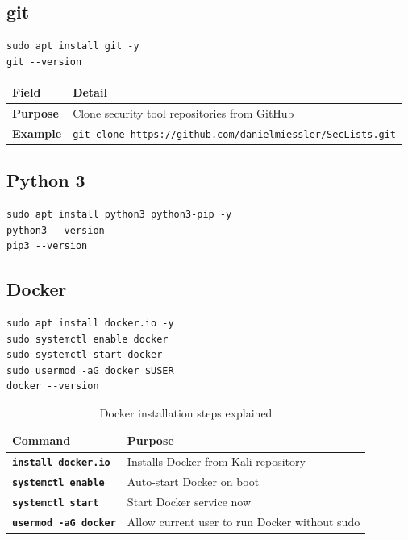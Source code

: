 \subsection{git}

\begin{lstlisting}[style=terminal, caption={Install git}]
sudo apt install git -y
git --version
\end{lstlisting}

\begin{table}[H]
\centering
\begin{tabularx}{\textwidth}{>{\bfseries}lX}
\toprule
Field & Detail \\
\midrule
Purpose & Clone security tool repositories from GitHub \\
Example & \texttt{git clone https://github.com/danielmiessler/SecLists.git} \\
\bottomrule
\end{tabularx}
\end{table}

\subsection{Python 3}

\begin{lstlisting}[style=terminal, caption={Install Python 3 and pip}]
sudo apt install python3 python3-pip -y
python3 --version
pip3 --version
\end{lstlisting}


\subsection{Docker}

\begin{lstlisting}[style=terminal, caption={Install Docker for running lab containers}]
sudo apt install docker.io -y
sudo systemctl enable docker
sudo systemctl start docker
sudo usermod -aG docker $USER
docker --version
\end{lstlisting}

\begin{table}[H]
\centering
\caption{Docker installation steps explained}
\begin{tabularx}{\textwidth}{>{\bfseries}lX}
\toprule
Command & Purpose \\
\midrule
\texttt{install docker.io} & Installs Docker from Kali repository \\
\texttt{systemctl enable} & Auto-start Docker on boot \\
\texttt{systemctl start} & Start Docker service now \\
\texttt{usermod -aG docker} & Allow current user to run Docker without sudo \\
\bottomrule
\end{tabularx}
\end{table}

